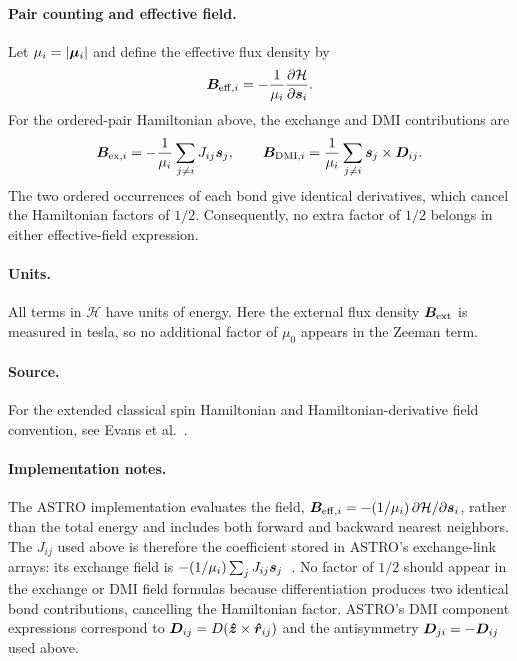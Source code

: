\paragraph{Pair counting and effective field.}
Let $\mu_i=\left\lvert \bm{\mu}_i \right\rvert$ and define the effective flux density by
\begin{equation}
    \bm{B}_{\mathrm{eff},i}
    =-\frac{1}{\mu_i}\frac{\partial\mathcal{H}}{\partial\bm{s}_i}.
    \label{eq:atomistic-effective-field}
\end{equation}
For the ordered-pair Hamiltonian above, the exchange and DMI contributions are
\begin{equation}
    \bm{B}_{\mathrm{ex},i}
    =-\frac{1}{\mu_i}\sum_{j\ne i}J_{ij}\bm{s}_j,
    \qquad
    \bm{B}_{\mathrm{DMI},i}
    =\frac{1}{\mu_i}\sum_{j\ne i}\bm{s}_j\times\bm{D}_{ij}.
    \label{eq:atomistic-pair-fields}
\end{equation}
The two ordered occurrences of each bond give identical derivatives, which
cancel the Hamiltonian factors of $1/2$.  Consequently, no extra factor of
$1/2$ belongs in either effective-field expression.

\paragraph{Units.}
All terms in $\mathcal{H}$ have units of energy.  Here the external flux density
$\bm{B}_{\mathrm{ext}}$ is measured in tesla, so no additional factor of $\mu_0$ appears in the
Zeeman term.

\paragraph{Source.}
For the extended classical spin Hamiltonian and Hamiltonian-derivative field
convention, see Evans et al.~\cite{evans2014atomistic}.

\paragraph{Implementation notes.}
The ASTRO implementation evaluates the field,
$\bm{B}_{\mathrm{eff},i}=-(1/\mu_i)\,\partial\mathcal{H}/\partial\bm{s}_i$,
rather than the total energy and includes both forward and backward nearest
neighbors.  The $J_{ij}$ used above is therefore the coefficient stored in
ASTRO's exchange-link arrays: its exchange field is
$-(1/\mu_i)\sum_jJ_{ij}\bm{s}_j$~\cite{astro-code}.  No factor of $1/2$ should
appear in the exchange or DMI field formulas because differentiation produces
two identical bond contributions, cancelling the Hamiltonian factor.  ASTRO's
DMI component expressions correspond to
$\bm{D}_{ij}=D(\bm{\hat{z}}\times\bm{\hat{r}}_{ij})$ and the antisymmetry
$\bm{D}_{ji}=-\bm{D}_{ij}$ used above.
